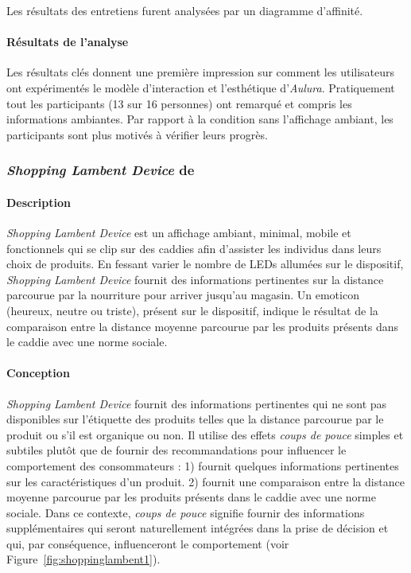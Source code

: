 \documentclass[10pt,a5paper,twoside]{article}
\begin{document}
Les résultats des entretiens furent analysées par un diagramme
d'affinité.

\paragraph{Résultats de l'analyse}\label{ruxe9sultats-de-lanalyse-1}

Les résultats clés donnent une première impression sur comment les
utilisateurs ont expérimentés le modèle d'interaction et l'esthétique
d'\emph{Aulura}. Pratiquement tout les participants (13 sur 16
personnes) ont remarqué et compris les informations ambiantes. Par
rapport à la condition sans l'affichage ambiant, les participants sont
plus motivés à vérifier leurs progrès.

\subsubsection{\emph{Shopping Lambent Device} de
\citet{kalnikaite2011nudge}}\label{shopping-lambent-device-de-kalnikaite2011nudge}

\paragraph{Description}\label{description-4}

\emph{Shopping Lambent Device} est un affichage ambiant, minimal, mobile
et fonctionnels qui se clip sur des caddies afin d'assister les
individus dans leurs choix de produits. En fessant varier le nombre de
LEDs allumées sur le dispositif, \emph{Shopping Lambent Device} fournit
des informations pertinentes sur la distance parcourue par la nourriture
pour arriver jusqu'au magasin. Un emoticon (heureux, neutre ou triste),
présent sur le dispositif, indique le résultat de la comparaison entre
la distance moyenne parcourue par les produits présents dans le caddie
avec une norme sociale.

\paragraph{Conception}\label{conception-4}

\emph{Shopping Lambent Device} fournit des informations pertinentes qui
ne sont pas disponibles sur l'étiquette des produits telles que la
distance parcourue par le produit ou s'il est organique ou non. Il
utilise des effets \emph{coups de pouce} simples et subtiles plutôt que
de fournir des recommandations pour influencer le comportement des
consommateurs : 1) fournit quelques informations pertinentes sur les
caractéristiques d'un produit. 2) fournit une comparaison entre la
distance moyenne parcourue par les produits présents dans le caddie avec
une norme sociale. Dans ce contexte, \emph{coups de pouce} signifie
fournir des informations supplémentaires qui seront naturellement
intégrées dans la prise de décision et qui, par conséquence,
influenceront le comportement (voir Figure~\ref{fig:shoppinglambent1}).
\end{document}
